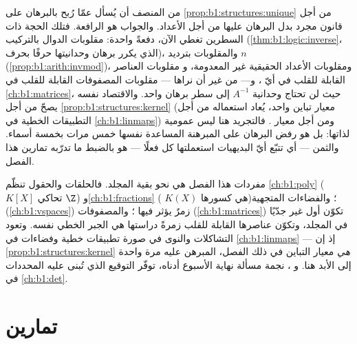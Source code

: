 \begin{remark}\label{rem:b1:structures:interlude}
من المنصف أن يُسأل عمّا رُبح بالبرهان على
\cref{prop:b1:structures:unique} من أجل قانون مجرد بدل
البرهان عليها من أجل الأعداد. والجواب هو الرافعة. فتلك الحجة ذات السطرين تغطي
الآن، دفعةً واحدة: مقلوبات الدوال بالتركيب
(\cref{thm:b1:logic:inverse}، الذي يكرر برهان وحدانيتها
حرفًا بحرف)، والمقلوبات بترديد $n$
(\cref{prop:b1:arith:invmod})، ومقلوبات الأعداد الحقيقية غير المعدومة، و
مقلوبات العناصر القابلة للقلب في أيّ ، و--- من غير أن نراها --- مقلوبات
المصفوفات القابلة للقلب في \cref{ch:b1:matrices}، حيث لن تحتاج وحدانية $A^{-1}$
إلى سطر برهان واحد. والاقتصاد نفسه يصحّ من أجل
\cref{prop:b1:structures:kernel} (معيار تباين واحد،
يُعاد استعماله من أجل التطبيقات الخطية في \cref{ch:b1:linmaps}) ومن أجل
معيار . فالتجريد هنا ليس عمومية لذاتها:
بل هو رفض البرهان على المبرهنة المساعدة نفسها خمس مرات
بخمسة أسماء. والثمن --- أي تتبّع أيّ البديهيات
استعملتها كل  فعلًا --- هو بالضبط ما تدرّبه تمارين
هذا الفصل.
\end{remark}

\begin{remark}\label{rem:b1:structures:whereused}
مفردات هذا الفصل هي نحو بقية
المجلد. فالحلقات والحقول تنظّم \cref{ch:b1:poly} ( $K[X]$ تحاكي $\Z$) و\cref{ch:b1:fractions} ( $K(X)$ هي  كسورها)؛ والفضاءات المتجهية (\cref{ch:b1:vspaces})
زمرٌ  يؤثر فيها ؛ والمصفوفات
(\cref{ch:b1:matrices}) تكوّن أول  غير 
جدّيًا في المجلد، وتكوّن عناصرها القابلة للقلب زمرةً دراستها
هي الجبر الخطي نفسه. وتعود التشاكلات والنوى في صورة
تطبيقات خطية وفضاءات  في \cref{ch:b1:linmaps} --- إذ إن \cref{prop:b1:structures:kernel} \emph{هي} معيار التباين
في ذلك الفصل، المبرهن عليه مرة واحدة إلى الأبد هنا. و
، نجمة مسألة نهاية الأسبوع أدناه، توفّر
التوقيع الذي تُبنى عليه المحددات في \cref{ch:b1:det}.
\end{remark}

\section{تمارين}


